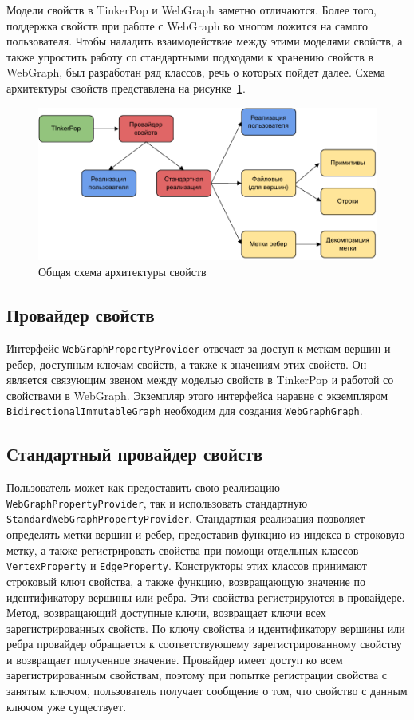 \documentclass[times,specification,annotation]{itmo-student-thesis}
\begin{document}
Модели свойств в TinkerPop и WebGraph заметно отличаются. Более того, поддержка свойств при работе с WebGraph во многом ложится на самого пользователя. Чтобы наладить взаимодействие между этими моделями свойств, а также упростить работу со стандартными подходами к хранению свойств в WebGraph, был разработан ряд классов, речь о которых пойдет далее. Схема архитектуры свойств представлена на рисунке~\ref{props-diagram}.

\begin{figure}[!h]
\caption{Общая схема архитектуры свойств}\label{props-diagram}
\centering
\includegraphics{img/props.pdf}
\end{figure}

\subsection{Провайдер свойств}\label{sec:provider}

Интерфейс \texttt{WebGraphPropertyProvider} отвечает за доступ к меткам вершин и ребер, доступным ключам свойств, а также к значениям этих свойств. Он является связующим звеном между моделью свойств в TinkerPop и работой со свойствами в WebGraph. Экземпляр этого интерфейса наравне с экземпляром \texttt{BidirectionalImmutableGraph} необходим для создания \texttt{WebGraphGraph}.

\subsection{Стандартный провайдер свойств}

Пользователь может как предоставить свою реализацию \texttt{WebGraphPropertyProvider}, так и использовать стандартную \texttt{StandardWebGraphPropertyProvider}. Стандартная реализация позволяет определять метки вершин и ребер, предоставив функцию из индекса в строковую метку, а также регистрировать свойства при помощи отдельных классов \texttt{VertexProperty} и \texttt{EdgeProperty}. Конструкторы этих классов принимают строковый ключ свойства, а также функцию, возвращающую значение по идентификатору вершины или ребра.
Эти свойства регистрируются в провайдере. Метод, возвращающий доступные ключи, возвращает ключи всех зарегистрированных свойств. По ключу свойства и идентификатору вершины или ребра провайдер обращается к соответствующему зарегистрированному свойству и возвращает полученное значение. Провайдер имеет доступ ко всем зарегистрированным свойствам, поэтому при попытке регистрации свойства с занятым ключом, пользователь получает сообщение о том, что свойство с данным ключом уже существует.
\end{document}
